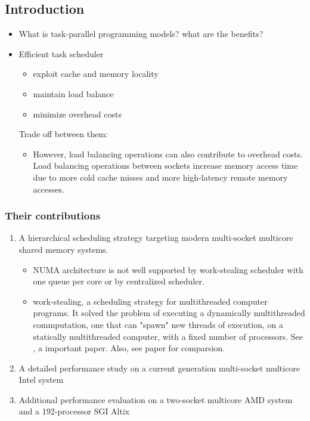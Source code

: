 \documentclass[11pt]{article}
\begin{document}
\subsection{Introduction}
\label{sec-4-2}
\begin{itemize}
\item What is task-parallel programming models? what are the benefits?
\item Efficient task scheduler
\begin{itemize}
\item exploit cache and memory locality
\item maintain load balance
\item minimize overhead costs
\end{itemize}
Trade off between them: 
\begin{itemize}
\item However, load balancing operations can also contribute to overhead costs. Load balancing operations between sockets increase memory access time due to more cold cache misses and more high-latency remote memory accesses.
\end{itemize}
\end{itemize}
\subsubsection{Their contributions}
\label{sec-4-2-1}
\begin{enumerate}
\item A hierarchical scheduling strategy targeting modern multi-socket multicore shared memory systems.
\label{sec-4-2-1-1}
\begin{itemize}
\item NUMA architecture is not well supported by work-stealing scheduler with one queue per core or by centralized scheduler.
\item work-stealing, a scheduling strategy for multithreaded computer programs. It solved the problem of executing a dynamically multithreaded commputation, one that can "spawn" new threads of execution, on a statically multithreaded computer, with a fixed number of processors. 
See \cite{blumofe99_sched_multit_comput_by_work_steal}, a important paper.
Also, see paper \cite{beaumont06_centr} for comparsion.
\end{itemize}

\item A detailed performance study on a current generation multi-socket multicore Intel system
\label{sec-4-2-1-2}
\item Additional performance evaluation on a two-socket multicore AMD system and a 192-processor SGI Altix
\label{sec-4-2-1-3}
\end{enumerate}
\end{document}
